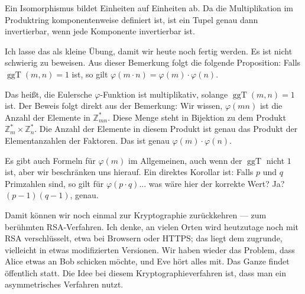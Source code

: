 \begin{math-stroke}

\begin{short-proof}
Ein Isomorphismus bildet Einheiten auf Einheiten ab. Da die Multiplikation im Produktring komponentenweise definiert ist, ist ein Tupel genau dann invertierbar, wenn jede Komponente invertierbar ist.
\end{short-proof}
\end{math-stroke}

\begin{spoken-clean}[01:16:24 - 01:18:39]
Ich lasse das als kleine Übung, damit wir heute noch fertig werden. Es ist nicht schwierig zu beweisen. Aus dieser Bemerkung folgt die folgende Proposition: Falls $\operatorname{ggT}(m, n) = 1$ ist, so gilt $\varphi(m \cdot n) = \varphi(m) \cdot \varphi(n)$.

Das heißt, die Eulersche $\varphi$-Funktion ist multiplikativ, solange $\operatorname{ggT}(m, n) = 1$ ist. Der Beweis folgt direkt aus der Bemerkung: Wir wissen, $\varphi(mn)$ ist die Anzahl der Elemente in $\mathbb{Z}_{mn}^*$. Diese Menge steht in Bijektion zu dem Produkt $\mathbb{Z}_m^* \times \mathbb{Z}_n^*$. Die Anzahl der Elemente in diesem Produkt ist genau das Produkt der Elementanzahlen der Faktoren. Das ist genau $\varphi(m) \cdot \varphi(n)$.

Es gibt auch Formeln für $\varphi(m)$ im Allgemeinen, auch wenn der $\operatorname{ggT}$ nicht $1$ ist, aber wir beschränken uns hierauf. Ein direktes Korollar ist: Falls $p$ und $q$ Primzahlen sind, so gilt für $\varphi(p \cdot q)$... was wäre hier der korrekte Wert? Ja? $(p - 1)(q - 1)$, genau.

Damit können wir noch einmal zur Kryptographie zurückkehren --- zum berühmten RSA-Verfahren. Ich denke, an vielen Orten wird heutzutage noch mit RSA verschlüsselt, etwa bei Browsern oder HTTPS; das liegt dem zugrunde, vielleicht in etwas modifizierten Versionen. Wir haben wieder das Problem, dass Alice etwas an Bob schicken möchte, und Eve hört alles mit. Das Ganze findet öffentlich statt. Die Idee bei diesem Kryptographieverfahren ist, dass man ein asymmetrisches Verfahren nutzt.
\end{spoken-clean}

